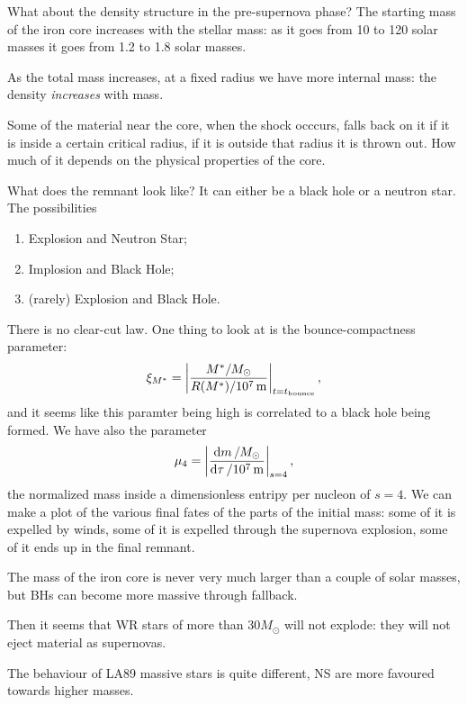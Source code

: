 \documentclass[main.tex]{subfiles}
\begin{document}
What about the density structure in the pre-supernova phase? 
The starting mass of the iron core increases with the stellar mass: as it goes from 10 to 120 solar masses it goes from 1.2 to 1.8 solar masses. 

As the total mass increases, at a fixed radius we have more internal mass: the density \emph{increases} with mass. 

Some of the material near the core, when the shock occcurs, falls back on it if it is inside a certain critical radius, if it is outside that radius it is thrown out. 
How much of it depends on the physical properties of the core. 

What does the remnant look like? It can either be a black hole or a neutron star. The possibilities 
\begin{enumerate}
    \item Explosion and Neutron Star;
    \item Implosion and Black Hole;
    \item (rarely) Explosion and Black Hole.
\end{enumerate}

There is no clear-cut law. One thing to look at is the bounce-compactness parameter: 
%
\begin{align}
  \xi_{M^*} = \abs{\frac{M^{*} / M_{\odot}}{R(M^{*}) / \SI{e7}{m}}}_{t = t _{\text{bounce}}}
\,,
\end{align}
%
and it seems like this paramter being high is correlated to a black hole being formed. 
We have also the parameter 
%
\begin{align}
  \mu_{4}  = \abs{\frac{ \dd{m} / M_{\odot}}{ \dd{\tau } / \SI{e7}{m}}}_{s=4}
\,,
\end{align}
%
the normalized mass inside a dimensionless entripy per nucleon of \(s=4\). 
We can make a plot of the various final fates of the parts of the initial mass: some of it is expelled by winds, some of it is expelled through the supernova explosion, some of it ends up in the final remnant.

The mass of the iron core is never very much larger than a couple of solar masses, but BHs can become more massive through fallback. 

Then it seems that WR stars of more than \(30 M_{\odot}\) will not explode: they will not eject material as supernovas. 


The behaviour of LA89 massive stars is quite different, NS are more favoured towards higher masses. 
\end{document}
